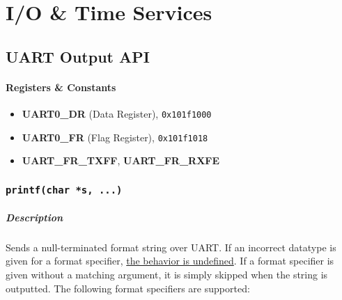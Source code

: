 \newpage
\chapter{I/O \& Time Services}

\section{UART Output API}

\subsubsection{Registers \& Constants}
\begin{itemize}
  \item \textbf{UART0\_DR} (Data Register), \texttt{0x101f1000}
  \item \textbf{UART0\_FR} (Flag Register), \texttt{0x101f1018}
  \item \textbf{UART\_FR\_TXFF}, \textbf{UART\_FR\_RXFE}
\end{itemize}

\subsection{\texttt{printf(char *s, ...)}}

\paragraph{Description}
Sends a null-terminated format string over UART. If an incorrect datatype is given 
for a format specifier, \underline{the behavior is undefined}. If a format specifier 
is given without a matching argument, it is simply skipped when the string is outputted. 
The following format specifiers are supported:


